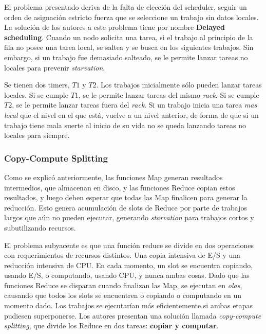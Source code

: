 \vspace{2mm}

El problema presentado deriva de la falta de elecci\'on del scheduler, seguir un orden de asignaci\'on estricto fuerza que se seleccione un trabajo sin datos locales. La soluci\'on de los autores a este problema tiene por nombre \textbf{Delayed scheduling}. Cuando un nodo solicita una tarea, si el trabajo al principio de la fila no posee una tarea local, se saltea y se busca en los siguientes trabajos. Sin embargo, si un trabajo fue demasiado salteado, se le permite lanzar tareas no locales para prevenir \emph{starvation}. 

\vspace{2mm}

Se tienen dos timers, $T1$ y $T2$. Los trabajos inicialmente s\'olo pueden lanzar tareas locales. Si se cumple $T1$, se le permite lanzar tareas del mismo \emph{rack}. Si se cumple $T2$, se le permite lanzar tareas fuera del \emph{rack}. Si un trabajo inicia una tarea \emph{mas local} que el nivel en el que est\'a, vuelve a un nivel anterior, de forma de que si un trabajo tiene mala suerte al inicio de su vida no se queda lanzando tareas no locales para siempre.

\vspace{2mm}


\subsubsection{Copy-Compute Splitting}

Como se explic\'o anteriormente, las funciones Map generan resultados intermedios, que almacenan en disco, y las funciones Reduce copian estos resultados, y luego deben esperar que todas las Map finalicen para generar la reducci\'on. Esto genera acumulaci\'on de slots de Reduce por parte de trabajos largos que a\'un no pueden ejecutar, generando \emph{starvation} para trabajos cortos y subutilizando recursos.

\vspace{2mm} 

El problema subyacente es que una funci\'on reduce se divide en dos operaciones con requerimientos de recursos distintos. Una copia intensiva de E/S y una reducci\'on intensiva de CPU. En cada momento, un slot se encuentra copiando, usando E/S, o computando, usando CPU, y nunca ambas cosas. Dado que las funciones Reduce se disparan cuando finalizan las Map, se ejecutan en \emph{olas}, causando que todos los slots se encuentren o copiando o computando en un momento dado. Los trabajos se ejecutar\'ian m\'as eficientemente si ambas etapas pudiesen superponerse. Los autores presentan una soluci\'on llamada \emph{copy-compute splitting}, que divide los Reduce en dos tareas: \textbf{copiar y computar}.

